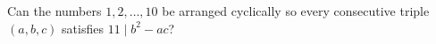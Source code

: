 Can the numbers $1,2,\ldots,10$ be arranged cyclically so every consecutive triple $(a,b,c)$ satisfies $11\mid b^2-ac$?
